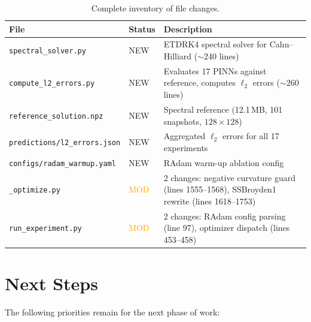\documentclass[11pt,a4paper]{article}
\begin{document}
\begin{table}[ht]
\centering
\caption{Complete inventory of file changes.}
\label{tab:files}
\begin{tabular}{@{}llp{7cm}@{}}
\toprule
\textbf{File} & \textbf{Status} & \textbf{Description} \\
\midrule
\texttt{spectral\_solver.py}        & \textcolor{diffadd}{NEW} &
  ETDRK4 spectral solver for Cahn--Hilliard ($\sim$240 lines) \\
\texttt{compute\_l2\_errors.py}     & \textcolor{diffadd}{NEW} &
  Evaluates 17 PINNs against reference, computes $\ell_2$ errors
  ($\sim$260 lines) \\
\texttt{reference\_solution.npz}    & \textcolor{diffadd}{NEW} &
  Spectral reference (12.1\,MB, 101 snapshots, $128 \times 128$) \\
\texttt{predictions/l2\_errors.json}& \textcolor{diffadd}{NEW} &
  Aggregated $\ell_2$ errors for all 17 experiments \\
\texttt{configs/radam\_warmup.yaml} & \textcolor{diffadd}{NEW} &
  RAdam warm-up ablation config \\
\texttt{\_optimize.py}              & \textcolor{orange}{MOD} &
  2 changes: negative curvature guard (lines 1555--1568), SSBroyden1
  rewrite (lines 1618--1753) \\
\texttt{run\_experiment.py}         & \textcolor{orange}{MOD} &
  2 changes: RAdam config parsing (line 97), optimizer dispatch
  (lines 453--458) \\
\bottomrule
\end{tabular}
\end{table}


\section{Next Steps}
\label{sec:next}

The following priorities remain for the next phase of work:
\end{document}

